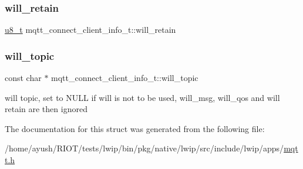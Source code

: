 \mbox{\label{structmqtt__connect__client__info__t_a49c10873f44d7534140a63eef2a6a4e3}} 
\subsubsection{\texorpdfstring{will\+\_\+retain}{will\_retain}}
{\footnotesize\ttfamily \hyperlink{group__compiler__abstraction_ga4caecabca98b43919dd11be1c0d4cd8e}{u8\+\_\+t} mqtt\+\_\+connect\+\_\+client\+\_\+info\+\_\+t\+::will\+\_\+retain}

\mbox{\label{structmqtt__connect__client__info__t_a1d79a9dd71c372543f0e0a68ebe2ca31}} 
\subsubsection{\texorpdfstring{will\+\_\+topic}{will\_topic}}
{\footnotesize\ttfamily const char $\ast$ mqtt\+\_\+connect\+\_\+client\+\_\+info\+\_\+t\+::will\+\_\+topic}

will topic, set to N\+U\+LL if will is not to be used, will\+\_\+msg, will\+\_\+qos and will retain are then ignored 

The documentation for this struct was generated from the following file\+:\begin{DoxyCompactItemize}
\item 
/home/ayush/\+R\+I\+O\+T/tests/lwip/bin/pkg/native/lwip/src/include/lwip/apps/\hyperlink{native_2lwip_2src_2include_2lwip_2apps_2mqtt_8h}{mqtt.\+h}\end{DoxyCompactItemize}
